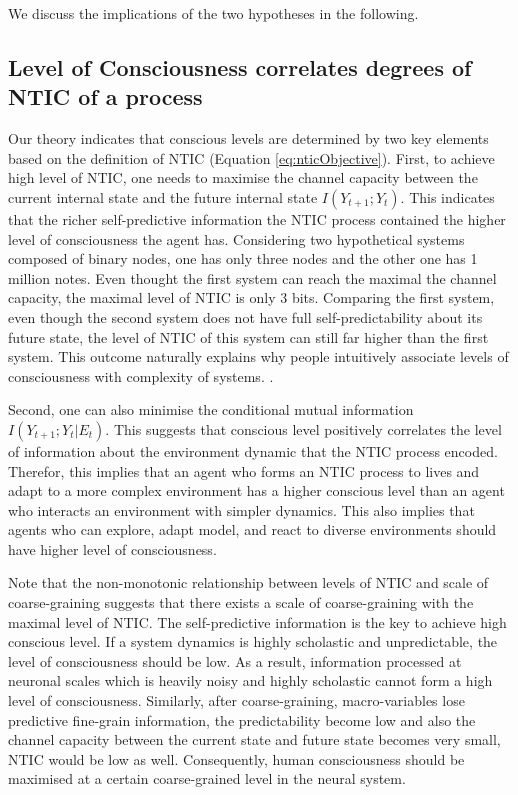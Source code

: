\documentclass[utf8]{article}
\begin{document}
		We discuss the implications of the two hypotheses in the following. 	
	    \subsection{Level of Consciousness correlates degrees of NTIC of a process}
	    
	    Our theory indicates that conscious levels are determined by two key elements based on the definition of NTIC (Equation \ref{eq:nticObjective}). First, to achieve high level of NTIC, one needs to maximise the channel capacity between the current internal state and the future internal state $I(Y_{t+1};Y_{t})$. This indicates that the richer self-predictive information the NTIC process contained the higher level of consciousness the agent has. Considering two hypothetical systems composed of binary nodes, one has only three nodes and the other one has 1 million notes. Even thought the first system can reach the maximal the channel capacity, the maximal level of NTIC is only 3 bits. Comparing the first system, even though the second system does not have full self-predictability about its future state, the level of NTIC of this system can still far higher than the first system. This outcome naturally explains why people intuitively associate levels of consciousness with complexity of systems. . 
	    
	    Second, one can also minimise the conditional mutual information  $I(Y_{t+1};Y_{t}|E_{t})$. This suggests that conscious level positively correlates the level of information about the environment dynamic that the NTIC process encoded. Therefor, this implies that an agent who forms an NTIC process to lives and adapt to a more complex environment has a higher conscious level than an agent who interacts an environment with simpler dynamics. This also implies that agents who can explore, adapt model, and react to diverse environments should have higher level of consciousness. 
	    
	    Note that the non-monotonic relationship between levels of NTIC and scale of coarse-graining suggests that there exists a scale of coarse-graining with the maximal level of NTIC. The self-predictive information is the key to achieve high conscious level. If a system dynamics is highly scholastic and unpredictable, the level of consciousness should be low. As a result, information processed at neuronal scales which is heavily noisy and highly scholastic cannot form a high level of consciousness. Similarly, after coarse-graining, macro-variables lose predictive fine-grain information, the predictability become low and also the channel capacity between the current state and future state becomes very small, NTIC would be low as well. Consequently, human consciousness should be maximised at a certain coarse-grained level in the neural system. 
	    
\end{document}
